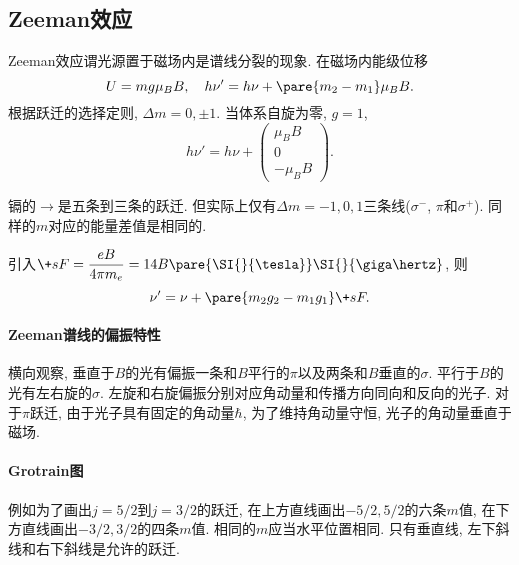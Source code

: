 \documentclass[hidelinks]{ctexart}
\begin{document}


\subsection{Zeeman效应} %
\label{sub:zeeman效应}

Zeeman效应谓光源置于磁场内是谱线分裂的现象. 在磁场内能级位移
\[ U = mg\mu_B B,\quad h\nu' = h\nu + \pare{m_2 - m_1}\mu_B B. \]
根据跃迁的选择定则, $\Delta m = 0, \pm 1$. 当体系自旋为零, $g=1$,
\[ h\nu' = h\nu + \begin{pmatrix}
    \mu_B B \\ 0 \\ -\mu_B B
\end{pmatrix}. \]
\begin{ex}
    镉的$\rightarrow$是五条到三条的跃迁. 但实际上仅有$\Delta m = -1, 0, 1$三条线($\sigma^-$, $\pi$和$\sigma^+$). 同样的$m$对应的能量差值是相同的.
\end{ex}
\begin{remark}
    引入$\displaystyle \+sF = \frac{eB}{4\pi m_e} = 14B \pare{\SI{}{\tesla}}\SI{}{\giga\hertz}$, 则
    \[ \nu' = \nu + \pare{m_2g_2 - m_1g_1}\+sF. \]
\end{remark}

\paragraph{Zeeman谱线的偏振特性} %
\label{par:zeeman谱线的偏振特性}

横向观察, 垂直于$B$的光有偏振一条和$B$平行的$\pi$以及两条和$B$垂直的$\sigma$. 平行于$B$的光有左右旋的$\sigma$. 左旋和右旋偏振分别对应角动量和传播方向同向和反向的光子. 对于$\pi$跃迁, 由于光子具有固定的角动量$\hbar$, 为了维持角动量守恒, 光子的角动量垂直于磁场.


\paragraph{Grotrain图} %
\label{par:grotrain图}

例如为了画出$j=5/2$到$j=3/2$的跃迁, 在上方直线画出$-5/2,5/2$的六条$m$值, 在下方直线画出$-3/2,3/2$的四条$m$值. 相同的$m$应当水平位置相同. 只有垂直线, 左下斜线和右下斜线是允许的跃迁.

\end{document}
